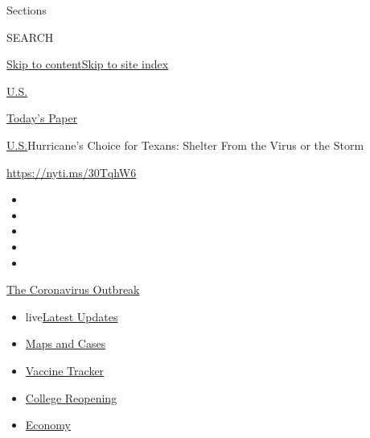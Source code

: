 Sections

SEARCH

\protect\hyperlink{site-content}{Skip to
content}\protect\hyperlink{site-index}{Skip to site index}

\href{https://www.nytimes.com/section/us}{U.S.}

\href{https://myaccount.nytimes.com/auth/login?response_type=cookie\&client_id=vi}{}

\href{https://www.nytimes.com/section/todayspaper}{Today's Paper}

\href{/section/us}{U.S.}\textbar{}Hurricane's Choice for Texans: Shelter
From the Virus or the Storm

\url{https://nyti.ms/30TqhW6}

\begin{itemize}
\item
\item
\item
\item
\item
\end{itemize}

\href{https://www.nytimes.com/news-event/coronavirus?action=click\&pgtype=Article\&state=default\&region=TOP_BANNER\&context=storylines_menu}{The
Coronavirus Outbreak}

\begin{itemize}
\tightlist
\item
  live\href{https://www.nytimes.com/2020/08/03/world/coronavirus-covid-19.html?action=click\&pgtype=Article\&state=default\&region=TOP_BANNER\&context=storylines_menu}{Latest
  Updates}
\item
  \href{https://www.nytimes.com/interactive/2020/us/coronavirus-us-cases.html?action=click\&pgtype=Article\&state=default\&region=TOP_BANNER\&context=storylines_menu}{Maps
  and Cases}
\item
  \href{https://www.nytimes.com/interactive/2020/science/coronavirus-vaccine-tracker.html?action=click\&pgtype=Article\&state=default\&region=TOP_BANNER\&context=storylines_menu}{Vaccine
  Tracker}
\item
  \href{https://www.nytimes.com/2020/08/02/us/covid-college-reopening.html?action=click\&pgtype=Article\&state=default\&region=TOP_BANNER\&context=storylines_menu}{College
  Reopening}
\item
  \href{https://www.nytimes.com/live/2020/08/03/business/stock-market-today-coronavirus?action=click\&pgtype=Article\&state=default\&region=TOP_BANNER\&context=storylines_menu}{Economy}
\end{itemize}

